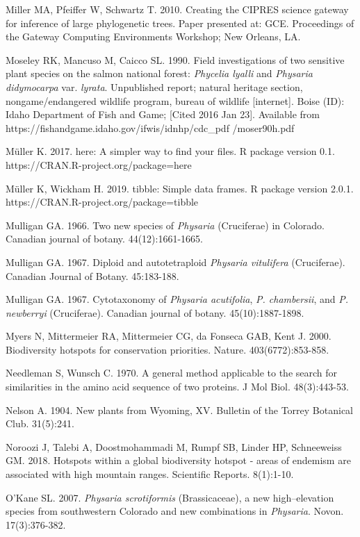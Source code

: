 Miller MA, Pfeiffer W, Schwartz T. 2010. Creating the CIPRES science gateway for inference of large phylogenetic trees. Paper presented at: GCE. Proceedings of the Gateway Computing Environments Workshop; New Orleans, LA.

Moseley RK, Mancuso M, Caicco SL. 1990. Field investigations of two sensitive plant species on the salmon national forest: \textit{Phycelia lyalli} and \textit{Physaria didymocarpa} var. \textit{lyrata}. Unpublished report; natural heritage section, nongame/endangered wildlife program, bureau of wildlife [internet]. Boise (ID): Idaho Department of Fish and Game; [Cited 2016 Jan 23]. Available from https://fishandgame.idaho.gov/ifwis/idnhp/cdc\_pdf /moser90h.pdf

Müller K. 2017. here: A simpler way to find your files. R package version 0.1. https://CRAN.R-project.org/package=here

Müller K, Wickham H. 2019. tibble: Simple data frames. R package version 2.0.1. https://CRAN.R-project.org/package=tibble

Mulligan GA. 1966. Two new species of \textit{Physaria} (Cruciferae) in Colorado. Canadian journal of botany. 44(12):1661-1665.

Mulligan GA. 1967. Diploid and autotetraploid \textit{Physaria vitulifera} (Cruciferae). Canadian Journal of Botany. 45:183-188.

Mulligan GA. 1967. Cytotaxonomy of \textit{Physaria acutifolia}, \textit{P. chambersii}, and \textit{P. newberryi} (Cruciferae). Canadian journal of botany. 45(10):1887-1898.

Myers N, Mittermeier RA, Mittermeier CG, da Fonseca GAB, Kent J. 2000. Biodiversity hotspots for conservation priorities. Nature. 403(6772):853-858.

Needleman S, Wunsch C. 1970. A general method applicable to the search for similarities in the amino acid sequence of two proteins. J Mol Biol. 48(3):443-53.

Nelson A. 1904. New plants from Wyoming, XV. Bulletin of the Torrey Botanical Club. 31(5):241.

Noroozi J, Talebi A, Doostmohammadi M, Rumpf SB, Linder HP, Schneeweiss GM. 2018. Hotspots within a global biodiversity hotspot - areas of endemism are associated with high mountain ranges. Scientific Reports. 8(1):1-10.

O’Kane SL. 2007. \textit{Physaria scrotiformis} (Brassicaceae), a new high–elevation species from southwestern Colorado and new combinations in \textit{Physaria}. Novon. 17(3):376-382.

